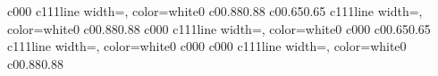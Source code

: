 \documentclass{standalone}
\begin{document}
\begin{knitdiagram}
{c}{0}{0}{0}
{c}{1}{1}{1}{line width=\outlineThickness*\dx, color=white}{0}
{c}{0}{0.88}{0.88}
{c}{0}{0.65}{0.65}
{c}{1}{1}{1}{line width=\outlineThickness*\dx, color=white}{0}
{c}{0}{0.88}{0.88}
{c}{0}{0}{0}
{c}{1}{1}{1}{line width=\outlineThickness*\dx, color=white}{0}
{c}{0}{0}{0}
{c}{0}{0.65}{0.65}
{c}{1}{1}{1}{line width=\outlineThickness*\dx, color=white}{0}
{c}{0}{0}{0}
{c}{0}{0}{0}
{c}{1}{1}{1}{line width=\outlineThickness*\dx, color=white}{0}
{c}{0}{0.88}{0.88}
\end{knitdiagram}
\end{document}

